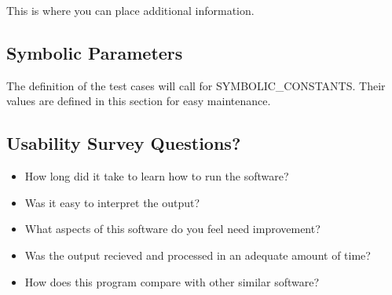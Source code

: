 \documentclass[12pt, titlepage]{article}
\begin{document}
This is where you can place additional information.

\subsection{Symbolic Parameters}

The definition of the test cases will call for SYMBOLIC\_CONSTANTS.
Their values are defined in this section for easy maintenance.

\subsection{Usability Survey Questions?}

\begin{itemize}
	\item How long did it take to learn how to run the software? 
	\item Was it easy to interpret the output? 
	\item What aspects of this software do you feel need improvement?
	\item Was the output recieved  and processed in an adequate amount of time?
	\item How does this program compare with other similar software?
\end{itemize} 

\end{document}
